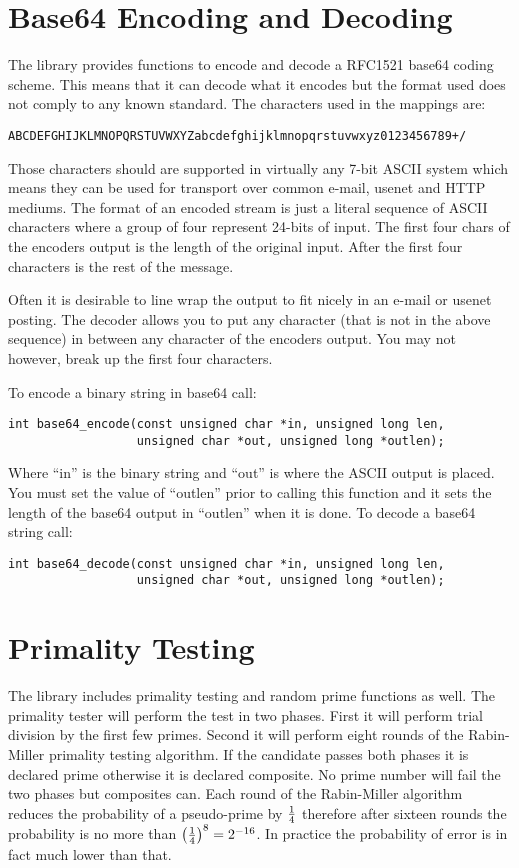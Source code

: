 \documentclass[a4paper]{book}
\begin{document}
\section{Base64 Encoding and Decoding}
The library provides functions to encode and decode a RFC1521 base64 coding scheme.  This means that it can decode what it 
encodes but the format used does not comply to any known standard.  The characters used in the mappings are:
\begin{verbatim}
ABCDEFGHIJKLMNOPQRSTUVWXYZabcdefghijklmnopqrstuvwxyz0123456789+/
\end{verbatim}
Those characters should are supported in virtually any 7-bit ASCII system which means they can be used for transport over
common e-mail, usenet and HTTP mediums.  The format of an encoded stream is just a literal sequence of ASCII characters
where a group of four represent 24-bits of input.  The first four chars of the encoders output is the length of the 
original input.  After the first four characters is the rest of the message.

Often it is desirable to line wrap the output to fit nicely in an e-mail or usenet posting.  The decoder allows you to
put any character (that is not in the above sequence) in between any character of the encoders output.  You may not however,
break up the first four characters.

To encode a binary string in base64 call:
   
\begin{verbatim}
int base64_encode(const unsigned char *in, unsigned long len, 
                  unsigned char *out, unsigned long *outlen);
\end{verbatim}
Where ``in'' is the binary string and ``out'' is where the ASCII output is placed.  You must set the value of ``outlen'' prior
to calling this function and it sets the length of the base64 output in ``outlen'' when it is done.  To decode a base64 
string call:
\begin{verbatim}
int base64_decode(const unsigned char *in, unsigned long len, 
                  unsigned char *out, unsigned long *outlen);
\end{verbatim}

\section{Primality Testing}
The library includes primality testing and random prime functions as well.  The primality tester will perform the test in
two phases.  First it will perform trial division by the first few primes.  Second it will perform eight rounds of the 
Rabin-Miller primality testing algorithm.  If the candidate passes both phases it is declared prime otherwise it is declared
composite.  No prime number will fail the two phases but composites can.  Each round of the Rabin-Miller algorithm reduces
the probability of a pseudo-prime by $1 \over 4$ therefore after sixteen rounds the probability is no more than 
$\left ( { 1 \over 4 } \right )^{8} = 2^{-16}$.  In practice the probability of error is in fact much lower than that.
\end{document}

